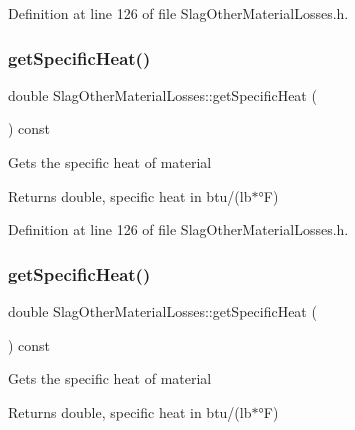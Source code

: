 Definition at line 126 of file Slag\+Other\+Material\+Losses.\+h.

\mbox{\label{class_slag_other_material_losses_aa68e92bdf836a4112c55344f897f2649}} 
\subsubsection{\texorpdfstring{get\+Specific\+Heat()}{getSpecificHeat()}\hspace{0.1cm}{\footnotesize\ttfamily [2/3]}}
{\footnotesize\ttfamily double Slag\+Other\+Material\+Losses\+::get\+Specific\+Heat (\begin{DoxyParamCaption}{ }\end{DoxyParamCaption}) const\hspace{0.3cm}{\ttfamily [inline]}}

Gets the specific heat of material \begin{DoxyReturn}{Returns}
double, specific heat in btu/(lb$\ast$°F) 
\end{DoxyReturn}


Definition at line 126 of file Slag\+Other\+Material\+Losses.\+h.

\mbox{\label{class_slag_other_material_losses_aa68e92bdf836a4112c55344f897f2649}} 
\subsubsection{\texorpdfstring{get\+Specific\+Heat()}{getSpecificHeat()}\hspace{0.1cm}{\footnotesize\ttfamily [3/3]}}
{\footnotesize\ttfamily double Slag\+Other\+Material\+Losses\+::get\+Specific\+Heat (\begin{DoxyParamCaption}{ }\end{DoxyParamCaption}) const\hspace{0.3cm}{\ttfamily [inline]}}

Gets the specific heat of material \begin{DoxyReturn}{Returns}
double, specific heat in btu/(lb$\ast$°F) 
\end{DoxyReturn}


